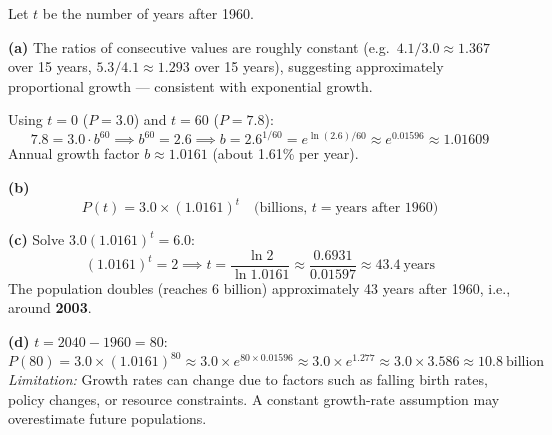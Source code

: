 \documentclass[addpoints]{exam}
\begin{document}
\begin{questions}
Let $t$ be the number of years after 1960.


\begin{solution}
\textbf{(a)} The ratios of consecutive values are roughly constant (e.g.\ $4.1/3.0 \approx 1.367$ over 15 years, $5.3/4.1 \approx 1.293$ over 15 years), suggesting approximately proportional growth --- consistent with exponential growth.

Using $t=0$ ($P=3.0$) and $t=60$ ($P=7.8$):
\[
7.8 = 3.0 \cdot b^{60} \implies b^{60} = 2.6 \implies b = 2.6^{1/60} = e^{\ln(2.6)/60} \approx e^{0.01596} \approx 1.01609
\]
Annual growth factor $b \approx 1.0161$ (about 1.61\% per year).

\textbf{(b)}
\[
P(t) = 3.0 \times (1.0161)^t \quad \text{(billions, } t = \text{years after 1960)}
\]

\textbf{(c)} Solve $3.0(1.0161)^t = 6.0$:
\[
(1.0161)^t = 2 \implies t = \frac{\ln 2}{\ln 1.0161} \approx \frac{0.6931}{0.01597} \approx 43.4\ \text{years}
\]
The population doubles (reaches 6 billion) approximately 43 years after 1960, i.e., around \textbf{2003}.

\textbf{(d)} $t = 2040 - 1960 = 80$:
\[
P(80) = 3.0 \times (1.0161)^{80} \approx 3.0 \times e^{80 \times 0.01596} \approx 3.0 \times e^{1.277} \approx 3.0 \times 3.586 \approx 10.8\ \text{billion}
\]
\textit{Limitation:} Growth rates can change due to factors such as falling birth rates, policy changes, or resource constraints. A constant growth-rate assumption may overestimate future populations.
\end{solution}


\end{questions}
\end{document}
